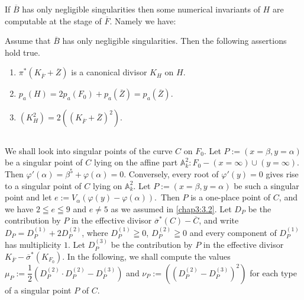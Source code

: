 If $\overline{B}$ has only negligible singularities then some
numerical invariants of $H$ are computable at the stage of
$\overline{F}$. Namely we have:

\begin{lemma*}
Assume that $\overline{B}$ has only negligible singularities. Then the
following assertions hold true.
\begin{enumerate}
\renewcommand{\labelenumi}{\rm(\theenumi)}
\item $\pi^{\ast}(K_{\overline{F}}+\overline{Z})$ is a canonical
  divisor $K_{H}$ on $H$.

\item
  $p_{a}(H)=2p_{a}(F_{0})+p_{a}(\overline{Z})=p_{a}(\overline{Z})$.

\item $(K^{2}_{H})=2((K_{\overline{F}}+\overline{Z})^{2})$.
\end{enumerate}
\end{lemma*}

\subsection{}\label{chap3:3.4}
We shall look into singular points of the curve $C$ on $F_{0}$. Let
$P:=(x=\beta,y=\alpha)$ be a singular point of $C$ lying on the affine
part $\mathbb{A}^{2}_{k}:F_{0}-(x=\infty)\cup (y=\infty)$. Then
$\varphi'(\alpha)=\beta^{5}+\varphi(\alpha)=0$. Conversely, every root
of $\varphi'(y)=0$ gives rise to a singular point of $C$ lying on
$\mathbb{A}^{2}_{k}$. Let $P:=(x=\beta,y=\alpha)$ be such a singular
point and let
$e:=V_{\alpha}(\varphi(y)-\varphi(\alpha))$.\pageoriginale\ Then $P$ is
a one-place point of $C$, and we have $2\leqq e\leqq 9$ and $e\neq 5$
as we assumed in \ref{chap3:3.2}. Let $D_{P}$ be the contribution by $P$ in
the effective divisor $\overline{\sigma}^{\ast}(C)-\overline{C}$, and
write $D_{P}=D^{(1)}_{P}+2D^{(2)}_{P}$, where $D^{(1)}_{P}\geqq 0$,
$D^{(2)}_{P}\geqq 0$ and every component of $D^{(1)}_{P}$ has
multiplicity $1$. Let $D^{(3)}_{P}$ be the contribution by $P$ in the
effective divisor
$K_{\overline{F}}-\overline{\sigma}^{\ast}(K_{F_{0}})$. In the
  following, we shall compute the values
  $\mu_{P}:=\dfrac{1}{2}(D^{(2)}_{P}\cdot D^{(2)}_{P}-D^{(3)}_{P})$
  and $\nu_{P}:=((D^{(2)}_{P}-D^{(3)}_{P})^{2})$ for each type of a
  singular point $P$ of $C$.

